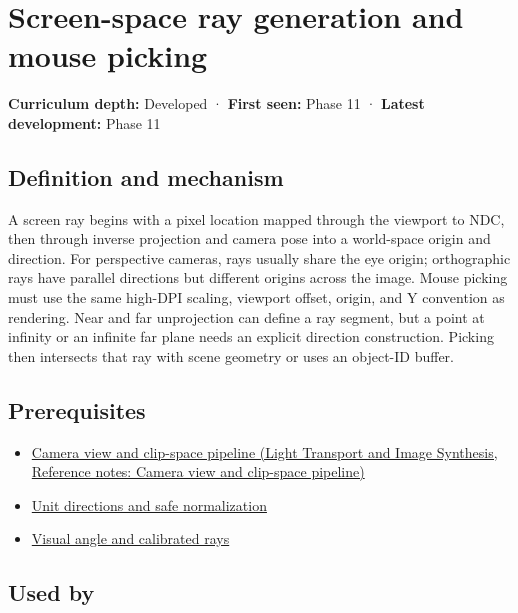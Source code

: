 \hypertarget{appendix-f1a6d43e80d1}{}\label{referencestart:appendix-f1a6d43e80d1}
\section{Screen-space ray generation and mouse picking}\label{appendix-f1a6d43e80d1-screen-space-ray-generation-and-mouse-picking}

\textbf{Curriculum depth:} Developed · \textbf{First seen:} Phase 11 · \textbf{Latest development:} Phase 11

\subsection{Definition and mechanism}\label{appendix-f1a6d43e80d1-definition-and-mechanism}

A screen ray begins with a pixel location mapped through the viewport to NDC, then through inverse projection and camera pose into a world-space origin and direction. For perspective cameras, rays usually share the eye origin; orthographic rays have parallel directions but different origins across the image. Mouse picking must use the same high-DPI scaling, viewport offset, origin, and Y convention as rendering. Near and far unprojection can define a ray segment, but a point at infinity or an infinite far plane needs an explicit direction construction. Picking then intersects that ray with scene geometry or uses an object-ID buffer.

\subsection{Prerequisites}\label{appendix-f1a6d43e80d1-prerequisites}

\begin{itemize}
\tightlist
\item
  \href{../04-Light-Transport-and-Image-Synthesis/main.pdf\#nameddest=appendix-1c07d64f5e70}{Camera view and clip-space pipeline (Light Transport and Image Synthesis, Reference notes: Camera view and clip-space pipeline)}
\item
  \hyperref[appendix-f744e41b95b4]{Unit directions and safe normalization}
\item
  \hyperref[appendix-7d356c396d1a]{Visual angle and calibrated rays}
\end{itemize}

\subsection{Used by}\label{appendix-f1a6d43e80d1-used-by}

